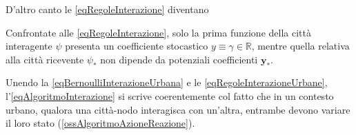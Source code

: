         D'altro canto le \ref{eqRegoleInterazione} diventano
        \begin{oss}
          Confrontate alle \ref{eqRegoleInterazione}, solo la prima funzione della città interagente \(\psi\) presenta un coefficiente stocastico \(y\equiv\gamma\in\mathbb R\), mentre quella relativa alla città ricevente \(\psi_*\) non dipende da potenziali coefficienti\footnotemark{} \(\mathbf y_*\).%
        \end{oss}

        Unendo la \ref{eqBernoulliInterazioneUrbana} e le \ref{eqRegoleInterazioneUrbane}, l'\ref{eqAlgoritmoInterazione} si scrive
        coerentemente col fatto che in un contesto urbano, qualora una città-nodo interagisca con un'altra, entrambe devono variare il loro stato (\cref{ossAlgoritmoAzioneReazione}).

